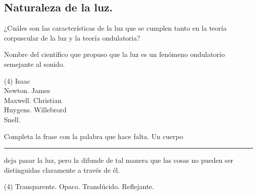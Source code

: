 \documentclass[12pt, letter]{exam}
\begin{document}


\newpage

\begin{questions}
    
    \section{Naturaleza de la luz.}

    \question ¿Cuáles son las características de la luz que se cumplen tanto en la teoría corpuscular de la luz y la teoría ondulatoria?
    \question Nombre del científico que propuso que la luz es un fenómeno ondulatorio semejante al sonido.
    \begin{tasks}(4)
        \task Isaac \\ Newton.
        \task James \\ Maxwell.
        \task Christian \\ Huygens.
        \task Willebrord \\ Snell.
    \end{tasks}
    \question Completa la frase con la palabra que hace falta. Un cuerpo \rule{2cm}{0.1mm} deja pasar la luz, pero la difunde de tal manera que las cosas no pueden ser distinguidas claramente a través de él.
    \begin{tasks}(4)
        \task Transparente.
        \task Opaco.
        \task Translúcido.
        \task Reflejante.
    \end{tasks}
    

\end{questions}
\end{document}
